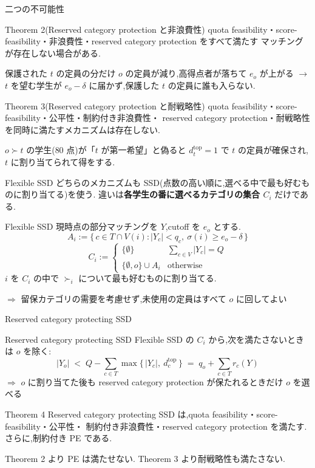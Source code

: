 \documentclass[aspectratio=43,11pt]{beamer}
\newcommand{\topf}{\mathrm{top}}
\newcommand{\dtop}[1]{d^{\topf}_{#1}}
\begin{document}
\begin{frame}{二つの不可能性}
\begin{block}{Theorem 2(Reserved category protection と非浪費性)}
  quota feasibility・score-feasibility・非浪費性・reserved category protection をすべて満たす
  マッチングが存在しない場合がある.
\end{block}
\small
保護された $t$ の定員の分だけ $o$ の定員が減り,高得点者が落ちて $e_o$ が上がる
$\to$ $t$ を望む学生が $e_o-\delta$ に届かず,保護した $t$ の定員に誰も入らない.
\normalsize
\medskip
\begin{block}{Theorem 3(Reserved category protection と耐戦略性)}
  quota feasibility・score-feasibility・公平性・制約付き非浪費性・
  reserved category protection・耐戦略性を同時に満たすメカニズムは存在しない.
\end{block}
\small
$o\succ t$ の学生($80$ 点)が「$t$ が第一希望」と偽ると $\dtop{t}=1$ で $t$ の定員が確保され,
$t$ に割り当てられて得をする.
\end{frame}

\begin{frame}{Flexible SSD}
\small
どちらのメカニズムも SSD(点数の高い順に,選べる中で最も好むものに割り当てる)を使う.
違いは\textbf{各学生の番に選べるカテゴリの集合 $C_i$} だけである.
\begin{block}{Flexible SSD}
  現時点の部分マッチングを $Y$,cutoff を $e_o$ とする.
  \[
    A_i := \{\, c \in T \cap V(i) : |Y_c| < q_c,\ \sigma(i) \geq e_o - \delta \,\}
  \]
  \[
    C_i :=
    \begin{cases}
      \{\emptyset\} & \sum_{c \in V} |Y_c| = Q \\[4pt]
      \{\emptyset, o\} \cup A_i & \text{otherwise}
    \end{cases}
  \]
  $i$ を $C_i$ の中で $\succ_i$ について最も好むものに割り当てる.
\end{block}
$\Rightarrow$ 留保カテゴリの需要を考慮せず,未使用の定員はすべて $o$ に回してよい
\end{frame}

\begin{frame}{Reserved category protecting SSD}
\small
\begin{block}{Reserved category protecting SSD}
  Flexible SSD の $C_i$ から,次を満たさないときは $o$ を除く:
  \[
    |Y_o| \;<\; Q - \sum_{c \in T} \max\{\, |Y_c|,\ \dtop{c} \,\}
    \;=\; q_o + \sum_{c \in T} r_c(Y)
  \]
  $\Rightarrow$ $o$ に割り当てた後も reserved category protection が保たれるときだけ $o$ を選べる
\end{block}
\begin{block}{Theorem 4}
  Reserved category protecting SSD は,quota feasibility・score-feasibility・公平性・
  制約付き非浪費性・reserved category protection を満たす.\\
  さらに,\alert{制約付き PE} である.
\end{block}
Theorem 2 より PE は満たせない.
Theorem 3 より耐戦略性も満たさない.
\end{frame}
\end{document}
